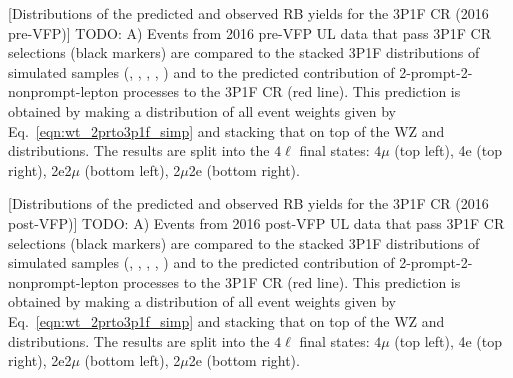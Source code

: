 \begin{multiFigure}
	\centering
		[Distributions of the predicted and observed RB yields for the 3P1F CR (2016 pre-VFP)]
		{TODO:
		\;A)
		Events from 2016 pre-VFP UL data that pass 3P1F CR selections (black markers) 
		are compared to the stacked 3P1F distributions of simulated samples
		(\Zplusjets, \ttbarplusjets, \WZ, \ZZ, \Zgammastar)
		and to the predicted contribution of 2-prompt-2-nonprompt-lepton processes to the 3P1F CR (red line).
		This prediction is obtained by making a distribution of all event weights given by Eq.~\ref{eqn:wt_2prto3p1f_simp} and stacking that on top of the WZ and \ZZ distributions.
		The results are split into the $4\ell$ final states:
		$4\mu$ (top left), 4e (top right), 2e2$\mu$ (bottom left), 2$\mu$2e (bottom right).}
	\label{cr_plots_3p1f_2016prevfp}
\end{multiFigure}
\begin{multiFigure}
	\centering
		[Distributions of the predicted and observed RB yields for the 3P1F CR (2016 post-VFP)]
		{TODO:
		\;A)
		Events from 2016 post-VFP UL data that pass 3P1F CR selections (black markers) 
		are compared to the stacked 3P1F distributions of simulated samples
		(\Zplusjets, \ttbarplusjets, \WZ, \ZZ, \Zgammastar)
		and to the predicted contribution of 2-prompt-2-nonprompt-lepton processes to the 3P1F CR (red line).
		This prediction is obtained by making a distribution of all event weights given by Eq.~\ref{eqn:wt_2prto3p1f_simp} and stacking that on top of the WZ and \ZZ distributions.
		The results are split into the $4\ell$ final states:
		$4\mu$ (top left), 4e (top right), 2e2$\mu$ (bottom left), 2$\mu$2e (bottom right).}
	\label{cr_plots_3p1f_2016postvfp}
\end{multiFigure}
